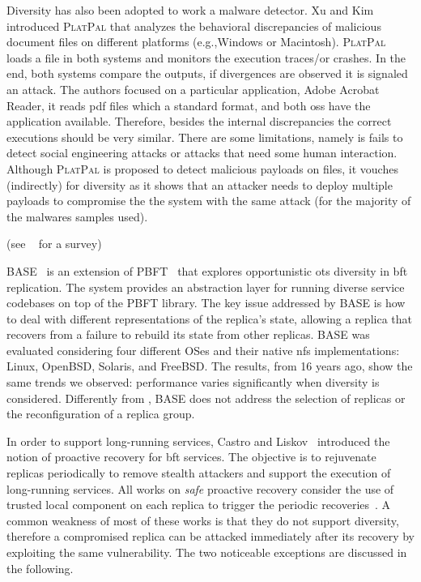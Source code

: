 Diversity has also been adopted to work a malware detector. 
Xu and Kim~\cite{Xu:2017} introduced \textsc{PlatPal} that analyzes the behavioral discrepancies of malicious document files on different platforms (e.g.,Windows or Macintosh). 
\textsc{PlatPal} loads a file in both systems and monitors the execution traces/or crashes. 
In the end, both systems compare the outputs, if divergences are observed it is signaled an attack.
The authors focused on a particular application, Adobe Acrobat Reader, it reads pdf files which a standard format, and both \glspl{os} have the application available.
Therefore, besides the internal discrepancies the correct executions should be very similar.
There are some limitations, namely is fails to detect social engineering attacks or attacks that need some human interaction.
Although \textsc{PlatPal} is proposed to detect malicious payloads on files, it vouches (indirectly) for diversity as it shows that an attacker needs to deploy multiple payloads to compromise the the system with the same attack (for the majority of the malwares samples used).

(see ~\cite{Yuan:2014} for a survey)


\textsc{BASE}~\cite{Rodrigues:2001} is an extension of PBFT~\cite{Castro:1999} that explores opportunistic \gls{ots} diversity in \gls{bft} replication. 
The system provides an abstraction layer for running diverse service codebases on top of the PBFT library.
The key issue addressed by BASE is how to deal with different representations of the replica's state, allowing a replica that recovers from a failure to rebuild its state from other replicas. 
BASE was evaluated considering four different OSes and their native \gls{nfs} implementations: Linux, OpenBSD, Solaris, and FreeBSD.
The results, from 16 years ago, show the same trends we observed: performance varies significantly when diversity is considered.
Differently from \system, \textsc{BASE} does not address the selection of replicas or the reconfiguration of a replica group.

In order to support long-running services, Castro and Liskov~\cite{Castro:2002} introduced the notion of proactive recovery for \gls{bft} services. 
The objective is to rejuvenate replicas periodically to remove stealth attackers and support the execution of long-running services. 
All works on \emph{safe} proactive recovery consider the use of trusted local component on each replica to trigger the periodic recoveries~\cite{Castro:2002,Sousa:2010,Roeder:2010,Platania:2014,Distler:2011}.
A common weakness of most of these works is that they do not support diversity, therefore a compromised replica can be attacked immediately after its recovery by exploiting the same vulnerability.
The two noticeable exceptions are discussed in the following.

